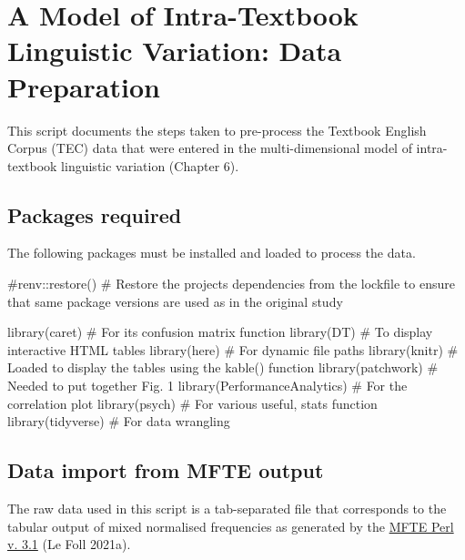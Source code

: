 \documentclass[
  letterpaper,
  DIV=11,
  numbers=noendperiod]{scrreprt}
\newenvironment{Shaded}{\begin{snugshade}}{\end{snugshade}}
\newcommand{\CommentTok}[1]{\textcolor[rgb]{0.37,0.37,0.37}{#1}}
\newcommand{\FunctionTok}[1]{\textcolor[rgb]{0.28,0.35,0.67}{#1}}
\newcommand{\NormalTok}[1]{\textcolor[rgb]{0.00,0.23,0.31}{#1}}
\begin{document}

\chapter{A Model of Intra-Textbook Linguistic Variation: Data
Preparation}\label{a-model-of-intra-textbook-linguistic-variation-data-preparation}

This script documents the steps taken to pre-process the Textbook
English Corpus (TEC) data that were entered in the multi-dimensional
model of intra-textbook linguistic variation (Chapter 6).

\section{Packages required}\label{packages-required}

The following packages must be installed and loaded to process the data.

\begin{Shaded}
\begin{Highlighting}[]
\CommentTok{\#renv::restore() \# Restore the project\textquotesingle{}s dependencies from the lockfile to ensure that same package versions are used as in the original study}

\FunctionTok{library}\NormalTok{(caret) }\CommentTok{\# For its confusion matrix function}
\FunctionTok{library}\NormalTok{(DT) }\CommentTok{\# To display interactive HTML tables}
\FunctionTok{library}\NormalTok{(here) }\CommentTok{\# For dynamic file paths}
\FunctionTok{library}\NormalTok{(knitr) }\CommentTok{\# Loaded to display the tables using the kable() function}
\FunctionTok{library}\NormalTok{(patchwork) }\CommentTok{\# Needed to put together Fig. 1}
\FunctionTok{library}\NormalTok{(PerformanceAnalytics) }\CommentTok{\# For the correlation plot}
\FunctionTok{library}\NormalTok{(psych) }\CommentTok{\# For various useful, stats function}
\FunctionTok{library}\NormalTok{(tidyverse) }\CommentTok{\# For data wrangling}
\end{Highlighting}
\end{Shaded}

\section{Data import from MFTE
output}\label{data-import-from-mfte-output}

The raw data used in this script is a tab-separated file that
corresponds to the tabular output of mixed normalised frequencies as
generated by the
\href{https://github.com/mshakirDr/MultiFeatureTaggerEnglish}{MFTE Perl
v. 3.1} (Le Foll 2021a).
\end{document}
